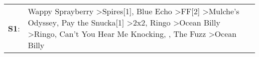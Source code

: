 \begin{supertabular}{p{0.03\textwidth}p{0.92\textwidth}}
 \textbf{S1}:  &  Wappy Sprayberry\textsuperscript{} \textgreater \enspace Spires[1]\textsuperscript{}, \enspace Blue Echo\textsuperscript{} \textgreater \enspace FF[2]\textsuperscript{} \textgreater \enspace Mulche's Odyssey\textsuperscript{}, \enspace Pay the Snucka[1]\textsuperscript{} \textgreater \enspace 2x2\textsuperscript{}, \enspace Ringo\textsuperscript{} \textgreater \enspace Ocean Billy\textsuperscript{} \textgreater \enspace Ringo\textsuperscript{}, \enspace Can't You Hear Me Knocking\textsuperscript{}, \textsuperscript{}, \enspace The Fuzz\textsuperscript{} \textgreater \enspace Ocean Billy\textsuperscript{}  \enspace  \\
\end{supertabular}
